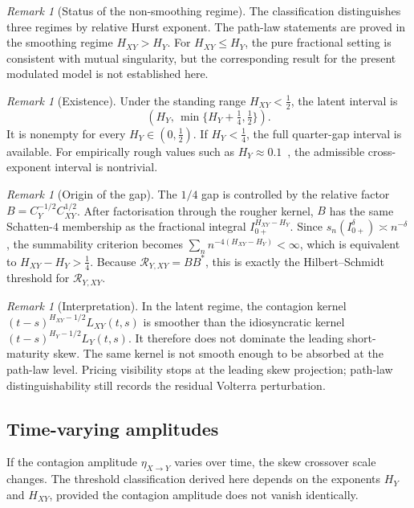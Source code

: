 \documentclass[11pt,a4paper]{amsart}
\theoremstyle{plain}
\theoremstyle{definition}
\theoremstyle{remark}
\newtheorem{remark}[theorem]{Remark}
\begin{document}
\begin{remark}[Status of the non-smoothing regime]
The classification distinguishes three regimes by relative Hurst exponent.  The path-law
statements are proved in the smoothing regime $H_{XY}>H_Y$.  For $H_{XY}\le H_Y$, the pure
fractional setting is consistent with mutual singularity, but the corresponding result for the
present modulated model is not established here.
\end{remark}

\begin{remark}[Existence]
Under the standing range $H_{XY}<\tfrac12$, the latent interval is
\[
(H_Y,\,\min\{H_Y+\tfrac14,\tfrac12\}).
\]
It is nonempty for every $H_Y\in(0,\tfrac12)$.  If $H_Y<\tfrac14$, the full quarter-gap interval is
available.  For empirically rough values such as $H_Y\approx 0.1$~\cite{GJR18}, the admissible
cross-exponent interval is nontrivial.
\end{remark}

\begin{remark}[Origin of the gap]\label{rem:gap}
The \(1/4\) gap is controlled by the relative factor
\(B=C_Y^{-1/2}C_{XY}^{1/2}\).  After factorisation through the rougher kernel, \(B\) has the
same Schatten-\(4\) membership as the fractional integral \(I_{0+}^{H_{XY}-H_Y}\).  Since
\(s_n(I_{0+}^{\delta})\asymp n^{-\delta}\), the summability criterion becomes
\(\sum_n n^{-4(H_{XY}-H_Y)}<\infty\), which is equivalent to
\(H_{XY}-H_Y>\tfrac14\).  Because \(\mathcal R_{Y,XY}=BB^*\), this is exactly the
Hilbert--Schmidt threshold for \(\mathcal R_{Y,XY}\).
\end{remark}

\begin{remark}[Interpretation]\label{rem:interp}
In the latent regime, the contagion kernel $(t-s)^{H_{XY}-1/2}L_{XY}(t,s)$ is smoother than the
idiosyncratic kernel $(t-s)^{H_Y-1/2}L_Y(t,s)$.  It therefore does not dominate the leading
short-maturity skew.  The same kernel is not smooth enough to be absorbed at the path-law level.
Pricing visibility stops at the leading skew projection; path-law distinguishability still records
the residual Volterra perturbation.
\end{remark}

\subsection{Time-varying amplitudes}\label{ss:crisis}

If the contagion amplitude $\eta_{X\to Y}$ varies over time, the skew crossover scale changes.
The threshold classification derived here depends on the exponents $H_Y$ and $H_{XY}$, provided the
contagion amplitude does not vanish identically.
\end{document}
